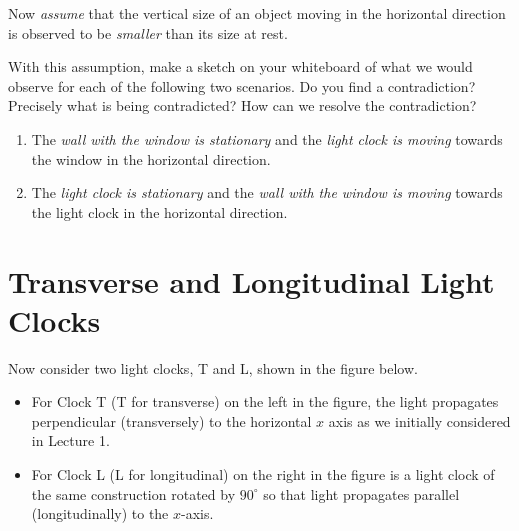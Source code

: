 \documentclass[11pt, letterpaper, openany]{book}
\begin{document}
\begin{law}
Now \textit{assume} that the vertical size of an object moving in the horizontal direction is observed to be \textit{smaller} than its size at rest.

With this assumption, make a sketch on your whiteboard of what we would observe for each of the following two scenarios. Do you find a contradiction? Precisely what is being contradicted? How can we resolve the contradiction?

\begin{enumerate}[label=(\alph*)]
    \item The \textit{wall with the window is stationary} and the \textit{light clock is moving} towards the window in the horizontal direction.
    \item The \textit{light clock is stationary} and the \textit{wall with the window is moving} towards the light clock in the horizontal direction.
\end{enumerate}
\end{law}

\section{Transverse and Longitudinal Light Clocks}

Now consider two light clocks, T and L, shown in the figure below.
\begin{itemize}
    \item For Clock T (T for transverse) on the left in the figure, the light propagates perpendicular (transversely) to the horizontal $x$ axis as we initially considered in Lecture 1.
    \item For Clock L (L for longitudinal) on the right in the figure is a light clock of the same construction rotated by $90^\circ$ so that light propagates parallel (longitudinally) to the $x$-axis.
\end{itemize}
\end{document}
